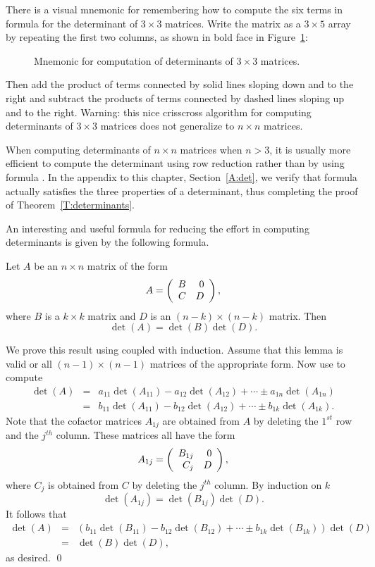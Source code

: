 There is a visual mnemonic for remembering how to compute the six
terms in formula  for the determinant of 
$3\times 3$ matrices.
Write the matrix as a $3\times 5$ array by repeating the first 
two columns, as shown in bold face in Figure~\ref{F:det3}:
\begin{figure}[htb]
           \centerline{%
            }
           \caption{Mnemonic for computation of determinants of 
		$3\times 3$ matrices.}
           \label{F:det3}
\end{figure}
Then add the product of terms connected by solid lines sloping down and 
to the right and subtract the products of terms connected by dashed lines 
sloping up and to the right.  Warning: this nice crisscross algorithm 
for computing determinants of $3\times 3$ matrices does not generalize 
to $n\times n$ matrices.
 
When computing determinants of $n\times n$ matrices when $n>3$,
it is usually more efficient to compute the determinant using row
reduction rather than by using formula .  In the
appendix to this chapter, Section~\ref{A:det}, we verify that formula 
 actually satisfies the three properties of a determinant, 
thus completing the proof of Theorem~\ref{T:determinants}.  

An interesting and useful formula for reducing the effort in 
computing determinants is given by the following formula.
\begin{lemma} \label{L:detblockdiag}
Let $A$ be an $n\times n$ matrix of the form
\[
A=\left(\begin{array}{rr} B & 0\\ C &D\end{array}\right),
\]
where $B$ is a $k\times k$ matrix and $D$ is an $(n-k)\times(n-k)$
matrix.  Then
\[
\det(A)=\det(B)\det(D).
\]
\end{lemma}

\proof We prove this result using  coupled with 
induction. Assume that this lemma is valid or all $(n-1)\times
(n-1)$ matrices of the appropriate form.  Now use
 to compute
\begin{eqnarray*}
\det(A) & = & a_{11}\det(A_{11})-a_{12}\det(A_{12}) + \cdots\pm
a_{1n}\det(A_{1n}) \\
& = &  b_{11}\det(A_{11})-b_{12}\det(A_{12}) + \cdots\pm
b_{1k}\det(A_{1k}).
\end{eqnarray*}
Note that the cofactor matrices $A_{1j}$ are obtained from $A$
by deleting the $1^{st}$ row and the $j^{th}$ column.  These
matrices all have the form
\[
A_{1j} = \left(\begin{array}{rr} B_{1j} & 0\\ C_j &D\end{array}\right),
\]
where $C_j$ is obtained from $C$ by deleting the $j^{th}$
column. By induction on $k$
\[
\det(A_{1j}) = \det(B_{1j})\det(D).
\]
It follows that 
\begin{eqnarray*}
\det(A) & = & \left(b_{11}\det(B_{11})-b_{12}\det(B_{12}) + \cdots\pm
b_{1k}\det(B_{1k})\right)\det(D) \\
& = & \det(B)\det(D),
\end{eqnarray*}
as desired.  \qed


